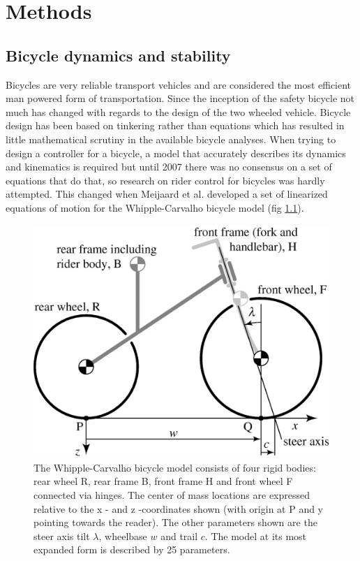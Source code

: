 \chapter{Methods} \label{methods}

\section{Bicycle dynamics and stability} \label{sub:bicycle}
Bicycles are  very reliable transport vehicles and are considered the most efficient man powered form of transportation. Since the inception of the safety bicycle not much has changed with regards to the design of the two wheeled vehicle.   Bicycle design has been based on tinkering rather than equations which has resulted in little mathematical scrutiny in the available bicycle analyses. When trying to design a controller for a bicycle, a model that accurately describes its dynamics and kinematics is required but until 2007 there was no consensus on a set of equations that do that, so research on rider control for bicycles was hardly attempted. This changed when Meijaard et al.\cite{meijaard2007linearized}  developed a set of linearized equations of motion for the Whipple-Carvalho bicycle  model (fig \ref{fig:figure2}).\par
\begin{figure}[ht]
    \centering
    \includegraphics[scale=0.3]{images/figure3_1.png}
    \caption{ The Whipple-Carvalho bicycle model consists of four rigid bodies: rear wheel R, rear frame B, front frame H and front wheel F connected via hinges. The center of mass locations are expressed relative to the x - and z -coordinates shown (with origin at P and y pointing towards the reader). The other parameters shown are the steer axis tilt \ensuremath{\lambda}, wheelbase \ensuremath{w} and trail \ensuremath{c}. The model at its most expanded form is described by 25 parameters.\cite{meijaard2007linearized}}
    \label{fig:figure2}
\end{figure}
